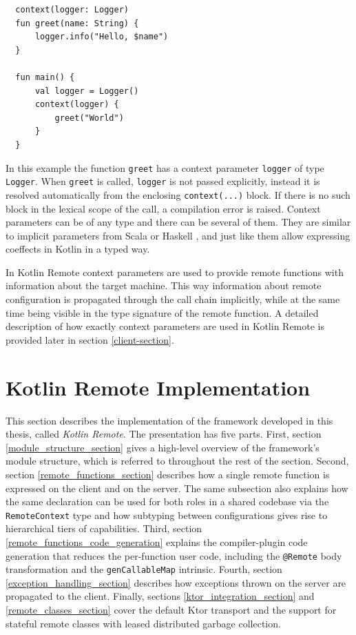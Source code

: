 \documentclass[a4paper,11pt,oneside]{article}
\newcommand{\term}[1]{\textit{#1}}
\newcommand{\kotlini}[1]{\texttt{#1}}
\begin{document}
\begin{listing}[!h]
  \begin{verbatim}
  context(logger: Logger)
  fun greet(name: String) {
      logger.info("Hello, $name")
  }

  fun main() {
      val logger = Logger()
      context(logger) {
          greet("World")
      }
  }
  \end{verbatim}
  \caption{Function with context parameter}\label{context_parameters_example}
\end{listing}

In this example the function \kotlini{greet} has a context parameter \kotlini{logger} of type
\kotlini{Logger}. When \kotlini{greet} is called, \kotlini{logger} is not passed explicitly,
instead it is resolved automatically from the enclosing \kotlini{context(...)} block. If there is
no such block in the lexical scope of the call, a compilation error is raised. Context parameters
can be of any type and there can be several of them. They are similar to implicit parameters from
Scala or Haskell \cite{lewis_implicit_2000}, and just like them allow expressing coeffects in
Kotlin in a typed way.

In Kotlin Remote context parameters are used to provide remote functions with information about
the target machine. This way information about remote configuration is propagated through the call
chain implicitly, while at the same time being visible in the type signature of the remote function.
A detailed description of how exactly context parameters are used in Kotlin Remote is provided later
in section \ref{client-section}.


\section{Kotlin Remote Implementation}

This section describes the implementation of the framework developed in this thesis, called
\term{Kotlin Remote}. The presentation has five parts. First, section
\ref{module_structure_section} gives a high-level overview of the framework's module structure,
which is referred to throughout the rest of the section. Second, section
\ref{remote_functions_section} describes how a single remote function is expressed on the client
and on the server. The same subsection also explains how the same declaration can be used for
both roles in a shared codebase via the \kotlini{RemoteContext} type and how subtyping between
configurations gives rise to hierarchical tiers of capabilities. Third, section
\ref{remote_functions_code_generation} explains the compiler-plugin code generation that reduces
the per-function user code, including the \kotlini{@Remote} body transformation and the
\kotlini{genCallableMap} intrinsic. Fourth, section \ref{exception_handling_section} describes
how exceptions thrown on the server are propagated to the client. Finally, sections
\ref{ktor_integration_section} and \ref{remote_classes_section} cover the default Ktor transport
and the support for stateful remote classes with leased distributed garbage collection.
\end{document}
